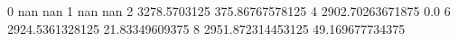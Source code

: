0 nan nan
1 nan nan
2 3278.5703125 375.86767578125
4 2902.70263671875 0.0
6 2924.5361328125 21.83349609375
8 2951.872314453125 49.169677734375
